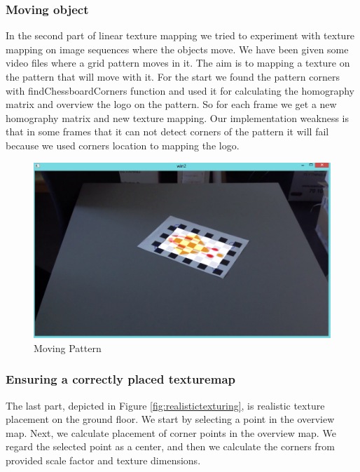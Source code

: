 \subsubsection{Moving object}

In the second part of linear texture mapping we tried to experiment with texture mapping on image sequences where the objects move. We have been given some video files where a grid pattern moves in it. The aim is to mapping a texture on the pattern that will move with it. For the start we found the pattern corners with findChessboardCorners function and used it for calculating the homography matrix and overview the logo on the pattern. So for each frame we get a new homography matrix and new texture mapping. Our implementation weakness is that in some frames that it can not detect corners of the pattern it will fail because we used corners location to mapping the logo.

\begin{figure}[h!]
	\centering
	\includegraphics[width=\textwidth]{final/images/linearmapping2.jpg}
	\caption{Moving Pattern}
	\label{fig:movingpattern}
\end{figure}

\subsubsection{Ensuring a correctly placed texturemap}

The last part, depicted in Figure \ref{fig:realistictexturing}, is realistic texture placement on the ground floor. We start by selecting a point in the overview map. Next, we calculate placement of corner points in the overview map. We regard the selected point as a center, and then we calculate the corners from provided scale factor and texture dimensions.

